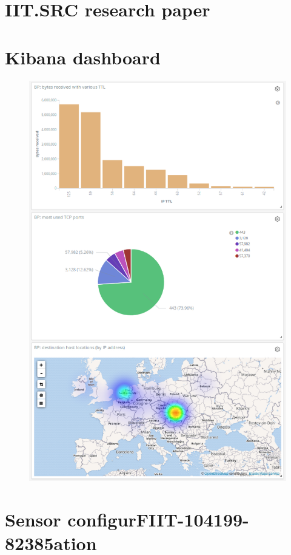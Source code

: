 \documentclass[12pt,a4paper,twoside]{report}
\begin{document}
\begin{appendices}
	\chapter{IIT.SRC research paper} \label{appendix:iitsrc:paper}
		
	\chapter{Kibana dashboard} \label{appendix:sol:dashboard}
		\begin{figure}[h]
			\centering
			\includegraphics[scale=0.38]{dashboard}
		\end{figure}
	\chapter{Sensor configurFIIT-104199-82385ation} \label{appendix:implementation:config}
		

\end{appendices}
\end{document}
